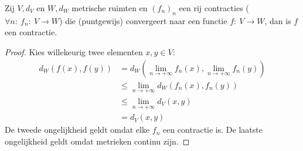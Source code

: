 \documentclass[main.tex]{subfiles}
\begin{document}
\begin{st}
  \label{st:limiet-van-rij-contracties-is-contractie}
  Zij $V,d_{V}$ en $W,d_{W}$ metrische ruimten en $(f_{n})_{n}$ een rij contracties ($\forall n:\ f_{n}:\ V \rightarrow W$) die (puntgewijs) convergeert naar een functie $f:\ V \rightarrow W$, dan is $f$ een contractie.
  
  \begin{proof}
    Kies willekeurig twee elementen $x,y\in V$:
    \begin{align*}
      d_{W}(f(x),f(y))
      &= d_{W}(\lim_{n\rightarrow +\infty}f_{n}(x),\lim_{n\rightarrow +\infty}f_{n}(y))\\
      &\le \lim_{n\rightarrow +\infty}d_{W}(f_{n}(x),f_{n}(y))\\
      &\le \lim_{n\rightarrow +\infty}d_{V}(x,y)\\
      &= d_{V}(x,y)
    \end{align*}
    De tweede ongelijkheid geldt omdat elke $f_{n}$ een contractie is.
    De laatste ongelijkheid geldt omdat metrieken continu zijn.
  \end{proof}
\end{st}
\end{document}
